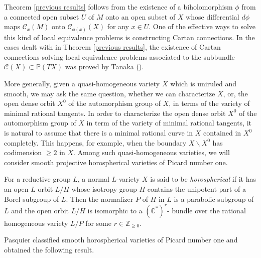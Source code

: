 \documentclass[12pt]{amsart}
\theoremstyle{plain}
\theoremstyle{definition}
\begin{document}
Theorem \ref{previous results} follows from the existence of a biholomorphism $\phi$ from a connected open subset $U$ of $M$ onto an open subset of $X$ whose differential $d\phi$ maps $\mathcal C_x(M)$ onto $\mathcal C_{\phi(x)}(X)$ for any $x \in U$. One  of the effective ways to solve this kind of local equivalence problems is  constructing  Cartan connections. In the  cases dealt with in Theorem \ref{previous results}, the existence of Cartan connections solving local equivalence problems associated to the subbundle $\mathcal C(X) \subset \mathbb P(TX)$  was proved by  Tanaka (\cite{Ta}).

More generally, given a quasi-homogeneous variety $X$ which is uniruled and smooth,  we may ask the same question, whether we can characterize $X$, or, the open dense orbit $X^0$ of the automorphism group of $X$, in terms of the variety of minimal rational tangents.    In order to characterize the open dense orbit $X^0$ of the automorphism group of $X$ in term of the variety of minimal rational tangents, it is natural to assume that there is a minimal rational curve in $X$ contained in $X^0$ completely. This happens, for example, when the boundary $X \backslash X^0$ has codimension $\geq 2$ in $X$. Among such quasi-homogeneous varieties, we will consider smooth projective horospherical varieties of Picard number one.



For a reductive   group $L$, a normal $L$-variety $X$ is said to be \emph{horospherical} if it has an open $L$-orbit $L/H$ whose isotropy group $H$ contains the unipotent part of a Borel subgroup of $L$. Then the normalizer $P$ of $H$ in $L$ is a parabolic subgroup of $L$ and the open orbit $L/H$ is isomorphic to a $(\mathbb C^*)^r$- bundle over the rational homogeneous variety $L/P$ for some $r \in \mathbb Z_{\geq 0}$. %

  Pasquier classified smooth horospherical varieties of Picard number one and obtained the following result.
\end{document}
